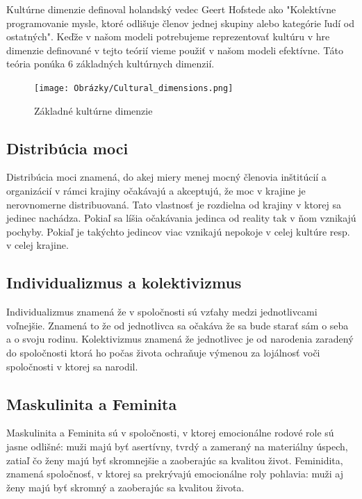 \documentclass[10pt,twoside,slovak,a4paper]{article}
\begin{document}
Kultúrne dimenzie definoval holandský vedec Geert Hofstede ako "Kolektívne programovanie mysle, %
ktoré odlišuje členov jednej skupiny alebo kategórie ľudí od ostatných". Keďže v našom modeli
potrebujeme reprezentovať kultúru v hre dimenzie definované v tejto teórií vieme použiť v našom
modeli efektívne. Táto teória ponúka 6 základných kultúrnych dimenzií.

\begin{figure}[H]
	\centering
	\texttt{[image: Obrázky/Cultural\_dimensions.png]}
	\caption{Základné kultúrne dimenzie}
	\label{fig:kultura}
\end{figure}

\subsection{Distribúcia moci}\label{kultura:moc}

Distribúcia moci znamená, do akej miery menej mocný členovia inštitúcií a organizácií v
rámci krajiny očakávajú a akceptujú, že moc v krajine je nerovnomerne distribuovaná. Tato
vlastnosť je rozdielna od krajiny v ktorej sa jedinec nachádza. Pokiaľ sa líšia očakávania
jedinca od reality tak v ňom vznikajú pochyby. Pokiaľ je takýchto jedincov viac vznikajú
nepokoje v celej kultúre resp. v celej krajine.

\subsection{Individualizmus a kolektivizmus}\label{kultura:etika}

Individualizmus znamená že v spoločnosti sú vzťahy medzi jednotlivcami voľnejšie. Znamená
to že od jednotlivca sa očakáva že sa bude starať sám o seba a o svoju rodinu. Kolektivizmus
znamená že jednotlivec je od narodenia zaradený do spoločnosti ktorá ho počas života ochraňuje
výmenou za lojálnosť voči spoločnosti v ktorej sa narodil.

\subsection{Maskulinita a Feminita}\label{kultura:masfem}

Maskulinita a Feminita sú v spoločnosti, v ktorej emocionálne rodové role sú jasne odlišné: 
muži majú byť asertívny, tvrdý a zameraný na materiálny úspech, zatiaľ čo ženy majú
byť skromnejšie a zaoberajúc sa kvalitou život. Feminidita, znamená spoločnosť, v ktorej
sa prekrývajú emocionálne roly pohlavia: muži aj ženy majú byť skromný a zaoberajúc
sa kvalitou života.
\end{document}
